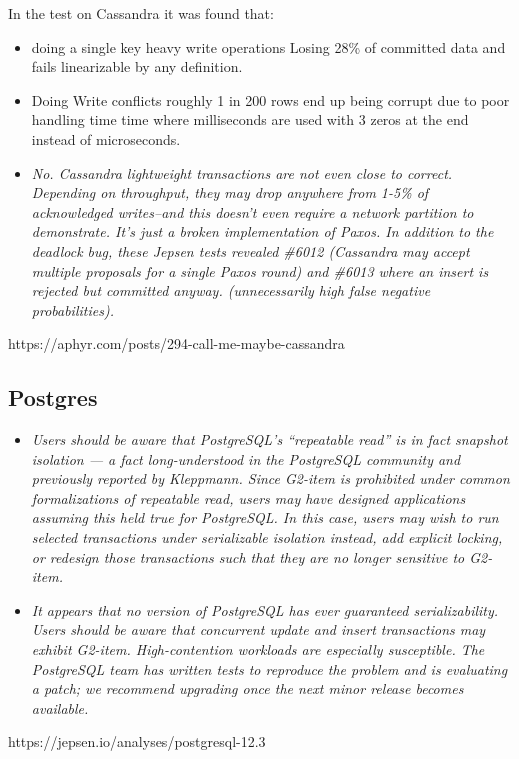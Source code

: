 \documentclass[a4paper,10pt,titlepage]{report}
\begin{document}
In the test on Cassandra it was found that:
\begin{itemize}
    \item doing a single key heavy write operations Losing 28\% of committed data and fails linearizable by any definition.
    \item Doing Write conflicts roughly 1 in 200 rows end up being corrupt due to poor handling time time where milliseconds are used with 3 zeros at the end instead of microseconds.
    \item \textit{No. Cassandra lightweight transactions are not even close to correct. Depending on throughput, they may drop anywhere from 1-5\% of acknowledged writes–and this doesn’t even require a network partition to demonstrate. It’s just a broken implementation of Paxos. In addition to the deadlock bug, these Jepsen tests revealed \#6012 (Cassandra may accept multiple proposals for a single Paxos round) and \#6013 where an insert is rejected but committed anyway. (unnecessarily high false negative probabilities).}
\end{itemize}

https://aphyr.com/posts/294-call-me-maybe-cassandra


\subsection{Postgres}



\begin{itemize}
    \item \textit{Users should be aware that PostgreSQL’s “repeatable read” is in fact snapshot isolation — a fact long-understood in the PostgreSQL community and previously reported by Kleppmann. Since G2-item is prohibited under common formalizations of repeatable read, users may have designed applications assuming this held true for PostgreSQL. In this case, users may wish to run selected transactions under serializable isolation instead, add explicit locking, or redesign those transactions such that they are no longer sensitive to G2-item.}
    \item \textit{It appears that no version of PostgreSQL has ever guaranteed serializability. Users should be aware that concurrent update and insert transactions may exhibit G2-item. High-contention workloads are especially susceptible. The PostgreSQL team has written tests to reproduce the problem and is evaluating a patch; we recommend upgrading once the next minor release becomes available.}
\end{itemize}
https://jepsen.io/analyses/postgresql-12.3
\end{document}

